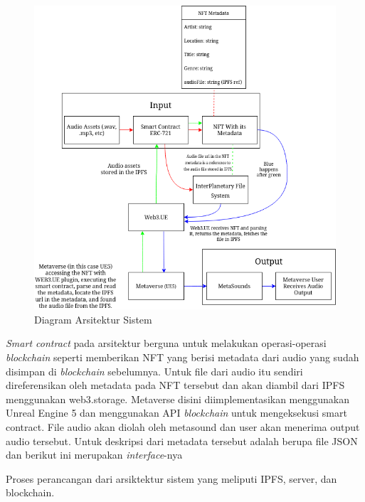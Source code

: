 \begin{figure} [ht] \centering
  \includegraphics[scale=0.65]{gambar/architecture.png}
  \caption{Diagram Arsitektur Sistem}
  \label{fig:Architecture}
\end{figure}

\emph{Smart contract} pada arsitektur berguna untuk melakukan operasi-operasi \emph{blockchain} seperti
memberikan NFT yang berisi metadata dari audio yang sudah disimpan di \emph{blockchain} sebelumnya.
Untuk file dari audio itu sendiri direferensikan oleh metadata pada NFT tersebut dan akan diambil dari
IPFS menggunakan web3.storage. Metaverse disini diimplementasikan menggunakan Unreal Engine 5 dan menggunakan API
\emph{blockchain} untuk mengeksekusi smart contract. File audio akan diolah oleh metasound dan user akan menerima output audio tersebut.
Untuk deskripsi dari metadata tersebut adalah berupa file JSON dan berikut ini merupakan \emph{interface}-nya


Proses perancangan dari arsiktektur sistem yang meliputi IPFS, server, dan blockchain.

